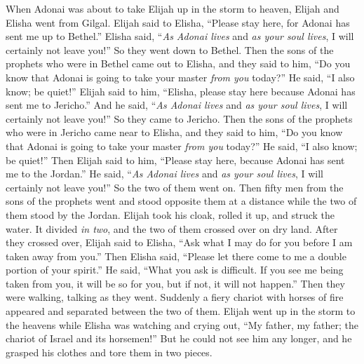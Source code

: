 \begin{biblechapter} %
 When Adonai was about to take Elijah up in the storm to heaven, Elijah and Elisha went from Gilgal.
\verse Elijah said to Elisha, “Please stay here, for Adonai has sent me up to Bethel.” Elisha said, “\textit{As Adonai lives} and \textit{as your soul lives}, I will certainly not leave you!” So they went down to Bethel.
\verse Then the sons of the prophets who were in Bethel came out to Elisha, and they said to him, “Do you know that Adonai is going to take your master \textit{from you} today?” He said, “I also know; be quiet!”
\verse Elijah said to him, “Elisha, please stay here because Adonai has sent me to Jericho.” And he said, “\textit{As Adonai lives} and \textit{as your soul lives}, I will certainly not leave you!” So they came to Jericho.
\verse Then the sons of the prophets who were in Jericho came near to Elisha, and they said to him, “Do you know that Adonai is going to take your master \textit{from you} today?” He said, “I also know; be quiet!”
\verse Then Elijah said to him, “Please stay here, because Adonai has sent me to the Jordan.” He said, “\textit{As Adonai lives} and \textit{as your soul lives}, I will certainly not leave you!” So the two of them went on.
\verse Then fifty men from the sons of the prophets went and stood opposite them at a distance while the two of them stood by the Jordan.
\verse Elijah took his cloak, rolled it up, and struck the water. It divided \textit{in two}, and the two of them crossed over on dry land.
\verse After they crossed over, Elijah said to Elisha, “Ask what I may do for you before I am taken away from you.” Then Elisha said, “Please let there come to me a double portion of your spirit.”
\verse He said, “What you ask is difficult. If you see me being taken from you, it will be so for you, but if not, it will not happen.”
\verse Then they were walking, talking as they went. Suddenly a fiery chariot with horses of fire appeared and separated between the two of them. Elijah went up in the storm to the heavens
\verse while Elisha was watching and crying out, “My father, my father; the chariot of Israel and its horsemen!” But he could not see him any longer, and he grasped his clothes and tore them in two pieces.

\end{biblechapter}
